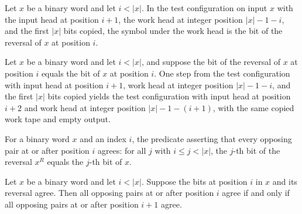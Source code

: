 \begin{lemma}
\label{Complexity.pal_test_read}
\leanok
{}
Let $x$ be a binary word and let $i<|x|$. In the test configuration on input $x$ with
the input head at position $i+1$, the work head at integer position $|x|-1-i$, and the
first $|x|$ bits copied, the symbol under the work head is the bit of the reversal of
$x$ at position $i$.
\end{lemma}

\begin{lemma}
\label{Complexity.pal_test_step}
\leanok
{}
Let $x$ be a binary word and let $i<|x|$, and suppose the bit of the reversal of $x$ at
position $i$ equals the bit of $x$ at position $i$. One step from the test configuration
with input head at position $i+1$, work head at integer position $|x|-1-i$, and the
first $|x|$ bits copied yields the test configuration with input head at position $i+2$
and work head at integer position $|x|-1-(i+1)$, with the same copied work tape and
empty output.
\end{lemma}

\begin{definition}
\label{Complexity.palMatches}
\leanok
For a binary word $x$ and an index $i$, the predicate asserting that every
opposing pair at or after position $i$ agrees: for all $j$ with
$i \le j < |x|$, the $j$-th bit of the reversal $x^{R}$ equals the $j$-th bit
of $x$.
\end{definition}

\begin{lemma}
\label{Complexity.palMatches_succ}
\leanok
{}
Let $x$ be a binary word and let $i<|x|$. Suppose the bits at position $i$ in $x$ and
its reversal agree. Then all opposing pairs at or after position $i$ agree if and only
if all opposing pairs at or after position $i+1$ agree.
\end{lemma}

